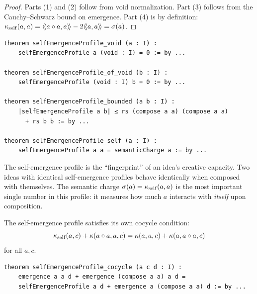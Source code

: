 \begin{proof}
Parts (1) and (2) follow from void normalization. Part (3) follows from the
Cauchy--Schwarz bound on emergence. Part (4) is by definition:
$\kappa_{\mathrm{self}}(a,a) = \langle\!\langle a \circ a, a \rangle\!\rangle - 2\langle\!\langle a, a \rangle\!\rangle = \sigma(a)$.
\end{proof}

\begin{lstlisting}[caption={Self-emergence profile (IDT\_v3\_Emergence.lean)}]
theorem selfEmergenceProfile_void (a : I) :
    selfEmergenceProfile a (void : I) = 0 := by ...

theorem selfEmergenceProfile_of_void (b : I) :
    selfEmergenceProfile (void : I) b = 0 := by ...

theorem selfEmergenceProfile_bounded (a b : I) :
    |selfEmergenceProfile a b| ≤ rs (compose a a) (compose a a)
      + rs b b := by ...

theorem selfEmergenceProfile_self (a : I) :
    selfEmergenceProfile a a = semanticCharge a := by ...
\end{lstlisting}

The self-emergence profile is the ``fingerprint'' of an idea's creative capacity.
Two ideas with identical self-emergence profiles behave identically when composed
with themselves. The semantic charge $\sigma(a) = \kappa_{\mathrm{self}}(a,a)$
is the most important single number in this profile: it measures how much
$a$ interacts with \emph{itself} upon composition.

\begin{theorem}
\label{thm:self-emergence-cocycle}
The self-emergence profile satisfies its own cocycle condition:
\[
  \kappa_{\mathrm{self}}(a, c) + \kappa(a \circ a, a, c)
  = \kappa(a, a, c) + \kappa(a, a \circ a, c)
\]
for all $a, c$.
\end{theorem}

\begin{lstlisting}[caption={Self-emergence profile cocycle (IDT\_v3\_Emergence.lean)}]
theorem selfEmergenceProfile_cocycle (a c d : I) :
    emergence a a d + emergence (compose a a) a d =
    selfEmergenceProfile a d + emergence a (compose a a) d := by ...
\end{lstlisting}

